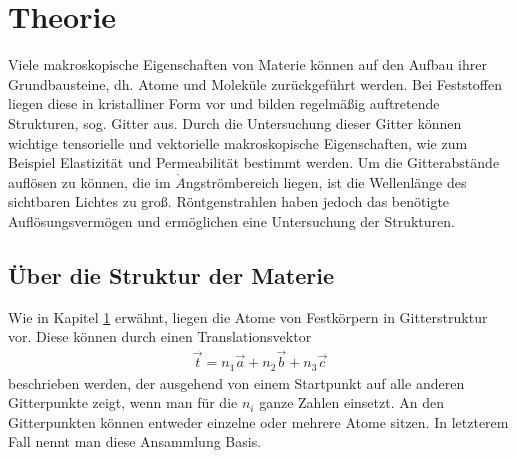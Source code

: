 

\section{Theorie}\label{sec:theorie}
Viele makroskopische Eigenschaften von Materie können auf den Aufbau ihrer Grundbausteine, dh. Atome und Moleküle zurückgeführt werden. Bei Feststoffen liegen diese in kristalliner Form vor und bilden regelmäßig auftretende Strukturen, sog. Gitter aus. Durch die Untersuchung dieser Gitter können wichtige tensorielle und vektorielle makroskopische Eigenschaften, wie zum Beispiel Elastizität und Permeabilität bestimmt werden. Um die Gitterabstände auflösen zu können, die im $\mathring{A}$ngströmbereich liegen, ist die Wellenlänge des sichtbaren Lichtes zu groß. Röntgenstrahlen haben jedoch das benötigte Auflösungsvermögen und ermöglichen eine Untersuchung der Strukturen.

\subsection{Über die Struktur der Materie}
Wie in Kapitel \ref{sec:theorie} erwähnt, liegen die Atome von Festkörpern in Gitterstruktur vor. Diese können durch einen Translationsvektor
\begin{align}
	\vec{t} = n_1\vec{a} +n_2\vec{b} + n_3\vec{c}
\end{align}
beschrieben werden, der ausgehend von einem Startpunkt auf alle anderen Gitterpunkte zeigt, wenn man für die $n_i$ ganze Zahlen einsetzt. An den Gitterpunkten können entweder einzelne oder mehrere Atome sitzen. In letzterem Fall nennt man diese Ansammlung Basis. 

